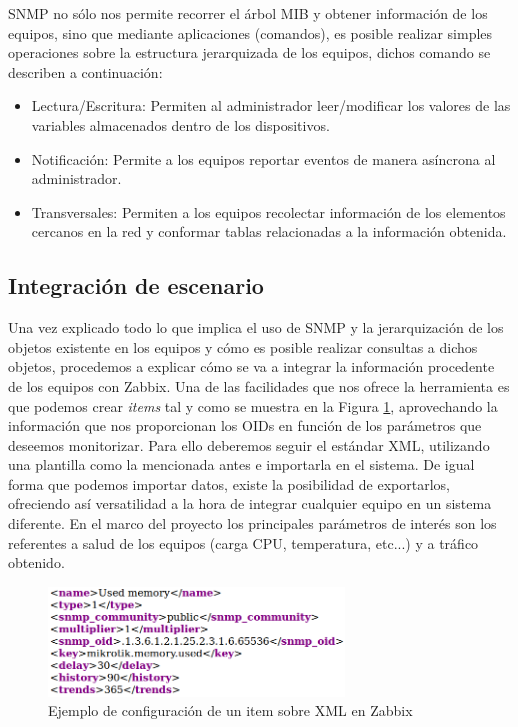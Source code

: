 SNMP no sólo nos permite recorrer el árbol MIB y obtener información de los equipos, sino que mediante aplicaciones (comandos), es posible realizar simples operaciones sobre la estructura jerarquizada de los equipos, dichos comando se describen a continuación:

\begin{itemize}
	\item Lectura/Escritura: Permiten al administrador leer/modificar los valores de las variables almacenados dentro de los dispositivos.
	\item Notificación: Permite a los equipos reportar eventos de manera asíncrona al administrador. 
	\item Transversales: Permiten a los equipos recolectar información de los elementos cercanos en la red y conformar tablas relacionadas a la información obtenida. 
\end{itemize}

\subsection{Integración de escenario}
Una vez explicado todo lo que implica el uso de SNMP y la jerarquización de los objetos existente en los equipos y cómo es posible realizar consultas a dichos objetos, procedemos a explicar cómo se va a integrar la información procedente de los equipos con Zabbix. Una de las facilidades que nos ofrece la herramienta es que podemos crear \textit{items} tal y como se muestra en la Figura \ref{xmlTest}, aprovechando la información que nos proporcionan los OIDs en función de los parámetros que deseemos monitorizar. Para ello deberemos seguir el estándar XML, utilizando una plantilla como la mencionada antes e importarla en el sistema. De igual forma que podemos importar datos, existe la posibilidad de exportarlos, ofreciendo así versatilidad a la hora de integrar cualquier equipo en un sistema diferente. En el marco del proyecto los principales parámetros de interés son los referentes a salud de los equipos (carga CPU, temperatura, etc...) y a tráfico obtenido. 

\begin{figure}[H]
	\centering
	\includegraphics[width=0.7\textwidth]{img/xml_example.png}
	\caption{Ejemplo de configuración de un item sobre XML en Zabbix}
	\label{xmlTest}
\end{figure}

